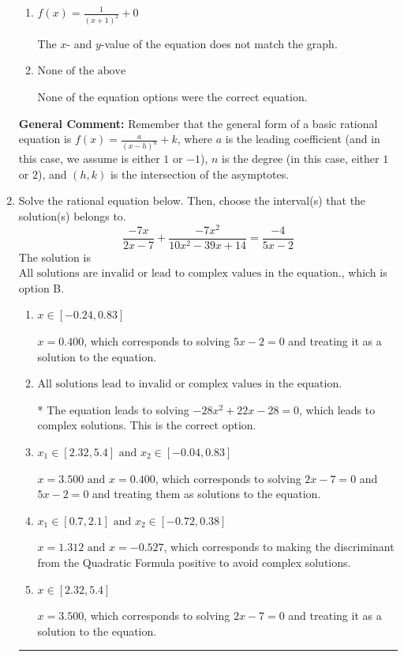\documentclass{extbook}[14pt]
\newcommand{\litem}[1]{\item #1

\rule{\textwidth}{0.4pt}}
\begin{document}
\begin{enumerate}
{\begin{enumerate}[label=\Alph*.]
Corresponds to using the general form $f(x) = \frac{a}{(x-h)^2}+k$, the opposite leading coefficient, AND not noticing the $y$-value was wrong.
\item \( f(x) = \frac{1}{(x + 1)^2} + 0 \)

The $x$- and $y$-value of the equation does not match the graph.
\item \( \text{None of the above} \)

None of the equation options were the correct equation.
\end{enumerate}

\textbf{General Comment:} Remember that the general form of a basic rational equation is $ f(x) = \frac{a}{(x-h)^n} + k$, where $a$ is the leading coefficient (and in this case, we assume is either $1$ or $-1$), $n$ is the degree (in this case, either $1$ or $2$), and $(h, k)$ is the intersection of the asymptotes.
}
\litem{
Solve the rational equation below. Then, choose the interval(s) that the solution(s) belongs to.
\[ \frac{-7x}{2x -7} + \frac{-7x^{2}}{10x^{2} -39 x + 14} = \frac{-4}{5x -2} \]The solution is \( \text{All solutions are invalid or lead to complex values in the equation.} \), which is option B.\begin{enumerate}[label=\Alph*.]
\item \( x \in [-0.24,0.83] \)

$x = 0.400$, which corresponds to solving $5x -2 = 0$ and treating it as a solution to the equation.
\item \( \text{All solutions lead to invalid or complex values in the equation.} \)

* The equation leads to solving $-28x^{2} +22 x -28=0$, which leads to complex solutions. This is the correct option.
\item \( x_1 \in [2.32, 5.4] \text{ and } x_2 \in [-0.04,0.83] \)

$x = 3.500 \text{ and } x = 0.400$, which corresponds to solving $2x -7 = 0$ and $5x -2 = 0$ and treating them as solutions to the equation.
\item \( x_1 \in [0.7, 2.1] \text{ and } x_2 \in [-0.72,0.38] \)

$x = 1.312 \text{ and } x = -0.527$, which corresponds to making the discriminant from the Quadratic Formula positive to avoid complex solutions.
\item \( x \in [2.32,5.4] \)

$x = 3.500$, which corresponds to solving $2x -7 = 0$ and treating it as a solution to the equation.
\end{enumerate}

}
\end{enumerate}
\end{document}
